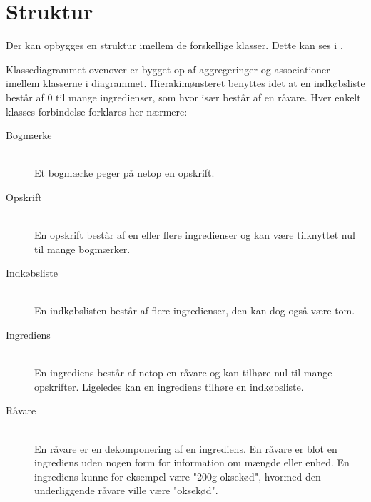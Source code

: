 \section{Struktur}
\label{sec:struktur}

Der kan opbygges en struktur imellem de forskellige klasser. Dette kan ses i . 



Klassediagrammet ovenover er bygget op af aggregeringer og associationer imellem klasserne i diagrammet. Hierakimønsteret benyttes idet at en indkøbsliste består af 0 til mange ingredienser, som hvor især består af en råvare. Hver enkelt klasses forbindelse forklares her nærmere:

\begin{description}
  \item[Bogmærke] \hfill \\
    Et bogmærke peger på netop en opskrift.

  \item[Opskrift] \hfill \\
    En opskrift består af en eller flere ingredienser og kan være tilknyttet nul til mange bogmærker.

\item[Indkøbsliste] \hfill \\
  En indkøbslisten består af flere ingredienser, den kan dog også være tom.

\item[Ingrediens] \hfill \\
  En ingrediens består af netop en råvare og kan tilhøre nul til mange opskrifter. Ligeledes kan en ingrediens tilhøre en indkøbsliste.

\item[Råvare] \hfill \\
  En råvare er en dekomponering af en ingrediens. En råvare er blot en ingrediens uden nogen form for information om mængde eller enhed. En ingrediens kunne for eksempel være "200g oksekød", hvormed den underliggende råvare ville være "oksekød".
\end{description}

